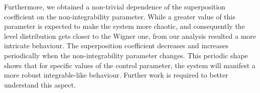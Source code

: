 \documentclass[../thesis.tex]{subfiles}
\begin{document}
Furthermore, we obtained a non-trivial dependence of the superposition coefficient
on the non-integrability parameter. While a greater value of this parameter is expected
to make the system more chaotic, and consequently the level distribution gets closer
to the Wigner one, from our analysis resulted a more intricate behaviour.
The superposition coefficient decreases and increases periodically when the
non-integrability parameter changes. This periodic shape shows that for specific values
of the control parameter, the system will manifest a more robust integrable-like
behaviour. Further work is required to better understand this aspect.
\end{document}
